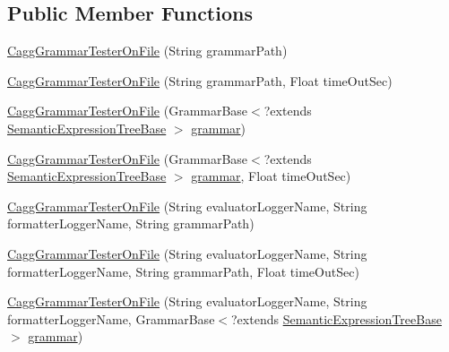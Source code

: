 \subsection*{Public Member Functions}
\begin{DoxyCompactItemize}
\item 
\hyperlink{classit_1_1emarolab_1_1cagg_1_1interfaces_1_1CaggGrammarTesterOnFile_af8a92838ea23cbbef59368d4c451c609}{Cagg\-Grammar\-Tester\-On\-File} (String grammar\-Path)
\item 
\hyperlink{classit_1_1emarolab_1_1cagg_1_1interfaces_1_1CaggGrammarTesterOnFile_aa6b3b7ada8010afea25eee78e64b7baf}{Cagg\-Grammar\-Tester\-On\-File} (String grammar\-Path, Float time\-Out\-Sec)
\item 
\hyperlink{classit_1_1emarolab_1_1cagg_1_1interfaces_1_1CaggGrammarTesterOnFile_a066bd32492c300b48a83db7bcea6eff9}{Cagg\-Grammar\-Tester\-On\-File} (Grammar\-Base$<$?extends \hyperlink{interfaceit_1_1emarolab_1_1cagg_1_1core_1_1evaluation_1_1semanticGrammar_1_1syntaxCompiler_1_1SemanticExpressionTreeBase}{Semantic\-Expression\-Tree\-Base} $>$ \hyperlink{classit_1_1emarolab_1_1cagg_1_1core_1_1evaluation_1_1interfacing_1_1GrammarTesterBase_ac6601808f37ef4327e6308143f01dc6a}{grammar})
\item 
\hyperlink{classit_1_1emarolab_1_1cagg_1_1interfaces_1_1CaggGrammarTesterOnFile_a0ea8b3c01a81f2b8d06952c7e5c56f03}{Cagg\-Grammar\-Tester\-On\-File} (Grammar\-Base$<$?extends \hyperlink{interfaceit_1_1emarolab_1_1cagg_1_1core_1_1evaluation_1_1semanticGrammar_1_1syntaxCompiler_1_1SemanticExpressionTreeBase}{Semantic\-Expression\-Tree\-Base} $>$ \hyperlink{classit_1_1emarolab_1_1cagg_1_1core_1_1evaluation_1_1interfacing_1_1GrammarTesterBase_ac6601808f37ef4327e6308143f01dc6a}{grammar}, Float time\-Out\-Sec)
\item 
\hyperlink{classit_1_1emarolab_1_1cagg_1_1interfaces_1_1CaggGrammarTesterOnFile_ae1a58b2755d8062dcc5a439c5fc7c67c}{Cagg\-Grammar\-Tester\-On\-File} (String evaluator\-Logger\-Name, String formatter\-Logger\-Name, String grammar\-Path)
\item 
\hyperlink{classit_1_1emarolab_1_1cagg_1_1interfaces_1_1CaggGrammarTesterOnFile_a0daf3f9474f54f6353a2cca3b913ad0a}{Cagg\-Grammar\-Tester\-On\-File} (String evaluator\-Logger\-Name, String formatter\-Logger\-Name, String grammar\-Path, Float time\-Out\-Sec)
\item 
\hyperlink{classit_1_1emarolab_1_1cagg_1_1interfaces_1_1CaggGrammarTesterOnFile_a692ba1f7cbe8e46eaaa553426299ee52}{Cagg\-Grammar\-Tester\-On\-File} (String evaluator\-Logger\-Name, String formatter\-Logger\-Name, Grammar\-Base$<$?extends \hyperlink{interfaceit_1_1emarolab_1_1cagg_1_1core_1_1evaluation_1_1semanticGrammar_1_1syntaxCompiler_1_1SemanticExpressionTreeBase}{Semantic\-Expression\-Tree\-Base} $>$ \hyperlink{classit_1_1emarolab_1_1cagg_1_1core_1_1evaluation_1_1interfacing_1_1GrammarTesterBase_ac6601808f37ef4327e6308143f01dc6a}{grammar})

\end{DoxyCompactItemize}
